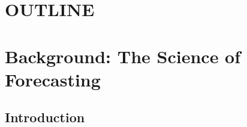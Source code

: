 \documentclass[12pt,a4paper]{article}
\begin{document}
\thispagestyle{empty}

\setcounter{page}{1}
\clearpage

\setcounter{page}{1}

\section*{OUTLINE}
\section*{Background: The Science of Forecasting}
\subsection*{Introduction}
\end{document}
